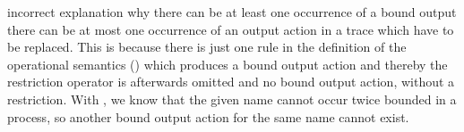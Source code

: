\begin{old}{incorrect explanation why there can be at least one occurrence of a bound output}
there can be at most one occurrence of an output action in a trace which have to be replaced. This is because there is just one rule in the definition of the operational semantics () which produces a bound output action and thereby the restriction operator is afterwards omitted and no bound output action, without a restriction. With , we know that the given name cannot occur twice bounded in a process, so another bound output action for the same name cannot exist.
\end{old}
